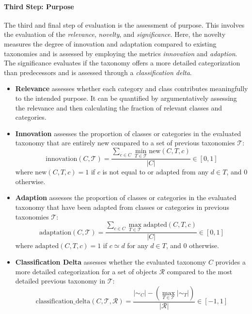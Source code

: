 \paragraph{Third Step: Purpose} The third and final step of evaluation is the assessment of purpose. This involves the evaluation of the \emph{relevance}, \emph{novelty}, and \emph{significance}. Here, the novelty measures the degree of innovation and adaptation compared to existing taxonomies and is assessed by employing the metrics \emph{innovation} and \emph{adaption}. The significance evaluates if the taxonomy offers a more detailed categorization than predecessors and is assessed through a \emph{classification delta}.

\begin{itemize}
    \item \textbf{Relevance} assesses whether each category and class contributes meaningfully to the intended purpose. It can be quantified by argumentatively assessing the relevance and then calculating the fraction of relevant classes and categories.

    \item \textbf{Innovation} assesses the proportion of classes or categories in the evaluated taxonomy that are entirely new compared to a set of previous taxonomies $\mathcal{T}$:
    \[
    \text{innovation}(C, \mathcal{T}) = \frac{\sum_{c \in C} \min_{T \in \mathcal{T}} \text{new}(C, T, c)}{|C|} \in [0, 1]
    \]
    where $\text{new}(C, T, c) = 1$ if $c$ is not equal to or adapted from any $d \in T$, and 0 otherwise.

    \item \textbf{Adaption} assesses the proportion of classes or categories in the evaluated taxonomy that have been adapted from classes or categories in previous taxonomies $\mathcal{T}$:
    \[
    \text{adaptation}(C, \mathcal{T}) = \frac{\sum_{c \in C} \max_{T \in \mathcal{T}} \text{adapted}(C, T, c)}{|C|} \in [0, 1]
    \]
    where $\text{adapted}(C, T, c) = 1$ if $c \simeq d$ for any $d \in T$, and 0 otherwise.

    \item \textbf{Classification Delta} assesses whether the evaluated taxonomy $C$ provides a more detailed categorization for a set of objects $\mathcal{R}$ compared to the most detailed previous taxonomy in $\mathcal{T}$:
    \[
    \text{classification\_delta}(C, \mathcal{T}, \mathcal{R}) = \frac{|\sim_C| - (\max_{T \in \mathcal{T}} |\sim_T|)}{|\mathcal{R}|} \in [-1, 1]
    \]
\end{itemize}






